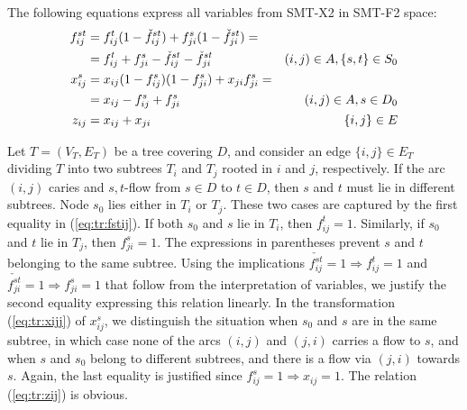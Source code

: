 The following equations express all variables from SMT-X2 in SMT-F2 space:
\begin{subequations}
\begin{align}
\notag\label{eq:tr:fstij}f^{st}_{ij}&=f^t_{ij}(1-\check{f}^{st}_{ij})+f^{s}_{ji}(1-\check{f}^{st}_{ji})= \\
&=  f^t_{ij}+f^s_{ji} - \check{f}^{st}_{ij} - \check{f}^{st}_{ji}& (i,j)\in A, \{s,t\}\in S_0\\
\notag\label{eq:tr:xijj}x^s_{ij}&=x_{ij}(1-f^{s}_{ij})(1-f^{s}_{ji})+x_{ji}f^{s}_{ji}=
\\&= x_{ij}-f^s_{ij} + f^{s}_{ji} & (i,j)\in A, s\in D_0\\
\label{eq:tr:zij}z_{ij}&=x_{ij}+x_{ji}& \{i,j\}\in E
\end{align}
\end{subequations}

Let $T=(V_T,E_T)$ be a tree covering $D$, and consider an edge $\{i,j\}\in E_T$ dividing $T$ into two subtrees $T_i$ and $T_j$ rooted in $i$ and $j$, respectively.  If the arc $(i,j)$ caries and $s,t$-flow from $s\in D$ to $t\in D$, then $s$ and $t$ must lie in different subtrees. Node $s_0$ lies either in $T_i$ or $T_j$.
These two cases are captured by the first equality in (\ref{eq:tr:fstij}). If both $s_0$ and $s$ lie in $T_i$, then $f_{ij}^t=1$. Similarly, if $s_0$ and $t$ lie in $T_j$, then $f_{ji}^s=1$. The expressions in parentheses prevent $s$ and $t$ belonging to the same subtree. Using the implications $\check{f^{st}_{ij}}=1\Rightarrow f_{ij}^t=1$ and $\check{f^{st}_{ji}}=1\Rightarrow f_{ji}^s=1$ that follow from the interpretation of variables, we justify the second equality expressing this relation linearly.
In the transformation (\ref{eq:tr:xijj}) of $x_{ij}^s$, we distinguish the situation when $s_0$ and $s$ are in the same subtree, in which case none of the arcs $(i,j)$ and $(j,i)$ carries a flow to $s$, and when $s$ and $s_0$ belong to different subtrees, and there is a flow via $(j,i)$ towards $s$. Again, the last equality is justified since $f_{ij}^s=1\Rightarrow x_{ij}=1$. The relation (\ref{eq:tr:zij}) is obvious.

